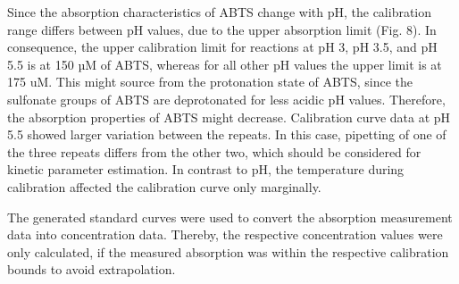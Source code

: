 \documentclass[letterpaper,12pt,english]{jupyterBook}
\begin{document}
\sphinxAtStartPar
Since the absorption characteristics of ABTS change with pH, the calibration range differs between pH values, due to the upper absorption limit (Fig. 8). In consequence, the upper calibration limit for reactions at pH 3, pH 3.5, and pH 5.5 is at 150 µM of ABTS, whereas for all other pH values the upper limit is at 175 uM. This might source from the protonation state of ABTS, since the sulfonate groups of ABTS are deprotonated for less acidic pH values. Therefore, the absorption properties of ABTS might decrease. Calibration curve data at pH 5.5 showed larger variation between the repeats. In this case, pipetting of one of the three repeats differs from the other two, which should be considered for kinetic parameter estimation. In contrast to pH, the temperature during calibration affected the calibration curve only marginally.

\sphinxAtStartPar
The generated standard curves were used to convert the absorption measurement data into concentration data. Thereby, the respective concentration values were only calculated, if the measured absorption was within the respective calibration bounds to avoid extrapolation.
\end{document}
